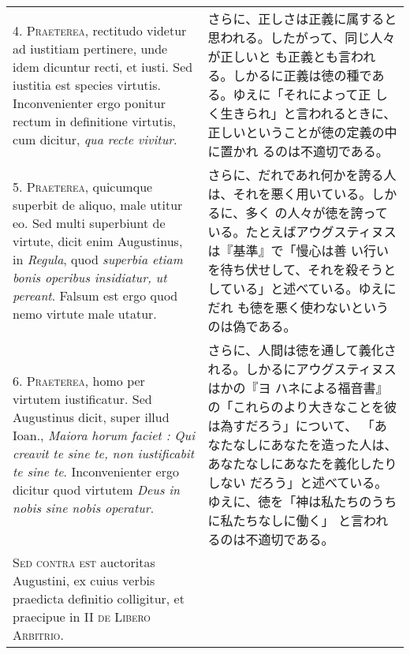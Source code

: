 \documentclass[10pt]{jsarticle}
\begin{document}
\begin{longtable}{p{21em}p{21em}}
\\



4. {\scshape Praeterea}, rectitudo videtur ad iustitiam pertinere,
unde idem dicuntur recti, et iusti. Sed iustitia est species
virtutis. Inconvenienter ergo ponitur rectum in definitione virtutis,
cum dicitur, {\itshape qua recte vivitur}.


&

さらに、正しさは正義に属すると思われる。したがって、同じ人々が正しいと
も正義とも言われる。しかるに正義は徳の種である。ゆえに「それによって正
しく生きられ」と言われるときに、正しいということが徳の定義の中に置かれ
るのは不適切である。

\\



5. {\scshape Praeterea}, quicumque superbit de aliquo, male utitur
eo. Sed multi superbiunt de virtute, dicit enim Augustinus, in
{\itshape Regula}, quod {\itshape superbia etiam bonis operibus
insidiatur, ut pereant}. Falsum est ergo quod nemo virtute male
utatur.


&

さらに、だれであれ何かを誇る人は、それを悪く用いている。しかるに、多く
の人々が徳を誇っている。たとえばアウグスティヌスは『基準』で「慢心は善
い行いを待ち伏せして、それを殺そうとしている」と述べている。ゆえにだれ
も徳を悪く使わないというのは偽である。

\\



6. {\scshape Praeterea}, homo per virtutem iustificatur. Sed
Augustinus dicit, super illud Ioan., {\itshape Maiora horum faciet :
Qui creavit te sine te, non iustificabit te sine te}. Inconvenienter
ergo dicitur quod virtutem {\itshape Deus in nobis sine nobis
operatur}.


&

さらに、人間は徳を通して義化される。しかるにアウグスティヌスはかの『ヨ
ハネによる福音書』の「これらのより大きなことを彼は為すだろう」について、
「あなたなしにあなたを造った人は、あなたなしにあなたを義化したりしない
だろう」と述べている。ゆえに、徳を「神は私たちのうちに私たちなしに働く」
と言われるのは不適切である。

\\



{\scshape Sed contra est} auctoritas Augustini, ex cuius verbis
praedicta definitio colligitur, et praecipue in II {\scshape de Libero
Arbitrio}.



\end{longtable}
\end{document}
